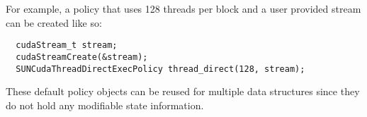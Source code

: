 For example, a policy that uses 128 threads per block and a user provided stream can be
created like so:

\begin{verbatim}
  cudaStream_t stream;
  cudaStreamCreate(&stream);
  SUNCudaThreadDirectExecPolicy thread_direct(128, stream);
\end{verbatim}

These default policy objects can be reused for multiple {\sundials} data structures
since they do not hold any modifiable state information.
